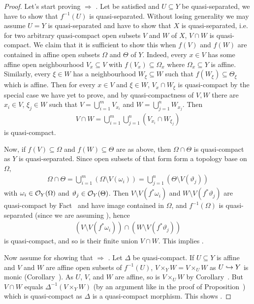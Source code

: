 \documentclass[a4paper,parskip=half,numbers=enddot, DIV=12]{scrreprt}
\begin{document}
\begin{proof}
    Let's start proving  $\Rightarrow$ . Let  be satisfied and $U\subseteq Y$ be quasi-separated, we have to show that $f^{-1}(U)$ is quasi-separated. Without losing generality we may assume $U=Y$ is quasi-separated and have to show that $X$ is quasi-separated, i.e. for two arbitrary quasi-compact open subsets $V$ and $W$ of $X$, $V\cap W$ is quasi-compact. We claim that it is sufficient to show this when $f(V)$ and $f(W)$ are contained in affine open subsets $\Omega$ and $\Theta$ of $Y$. Indeed, every $x\in V$ has some affine open neighbourhood $V_x\subseteq V$ with $f(V_x)\subseteq \Omega_x$ where $\Omega_x \subseteq Y$ is affine. Similarly, every $\xi\in W$ has a neighbourhood $W_\xi\subseteq W$ such that $f(W_\xi)\subseteq \Theta_\xi$ which is affine. Then for every $x\in V$ and $\xi \in W$, $V_x\cap W_\xi$ is quasi-compact by the special case we have yet to prove, and by quasi-compactness of $V,W$ there are $x_i\in V$, $\xi_j\in W$ such that $V=\bigcup_{i=1}^m V_{x_i}$ and $W = \bigcup_{j=1}^n W_{x_j}$. Then
    \begin{align*}
        V\cap W = \bigcup_{i=1}^m \bigcup_{j=1}^n (V_{x_i}\cap W_{\xi_j})
    \end{align*}
    is quasi-compact.
    
    Now, if $f(V)\subseteq \Omega$ and $f(W)\subseteq \Theta$ are as above, then $\Omega\cap \Theta$ is quasi-compact as $Y$ is quasi-separated. Since open subsets of that form form a topology base on $\Omega$, 
    \begin{align*}
        \Omega\cap \Theta = \bigcup_{i=1}^m (\Omega\setminus V(\omega_i))=\bigcup_{j=1}^n(\Theta \setminus V(\vartheta_j))
    \end{align*}
    with $\omega_i\in \mathcal{O}_Y(\Omega)$ and $\vartheta_j\in \mathcal{O}_Y(\Theta)$. Then $V\setminus V(f^*\omega_i)$ and $W\setminus V(f^* \vartheta_j)$ are quasi-compact by Fact~ and have image contained in $\Omega$, and $f^{-1}(\Omega)$ is quasi-separated (since we are assuming ), hence
    \begin{align*}
        (V\setminus V(f^*\omega_i))\cap (W\setminus V(f^* \vartheta_j))
    \end{align*}
    is quasi-compact, and so is their finite union $V\cap W$. This implies .
    
    Now assume  for showing that  $\Rightarrow$ . Let $\Delta$ be quasi-compact. If $U\subseteq Y$ is affine and $V$ and $W$ are affine open subsets of $f^{-1}(U)$, $V\times_Y W = V\times_U W$ as $U\monomorphism Y$ is monic (Corollary~). As $U$, $V$, and $W$ are affine, so is $V\times_U W$ by Corollary~. But $V\cap W$ equals $\Delta^{-1}(V\times_Y W)$ (by an argument like in the proof of Proposition~) which is quasi-compact as $\Delta$ is a quasi-compact morphism. This shows .
    

\end{proof}
\end{document}

